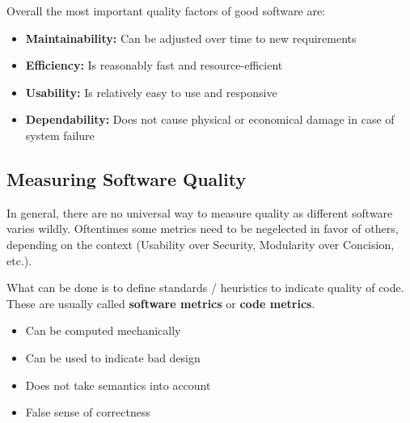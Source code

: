\documentclass[
../../Software_Engineering_Summary.tex,
]
{subfiles}
\begin{document}
Overall the most important quality factors of good software are:
\begin{itemize}
    \item \textbf{Maintainability:} Can be adjusted over time to new requirements
    \item \textbf{Efficiency:} Is reasonably fast and resource-efficient
    \item \textbf{Usability:} Is relatively easy to use and responsive
    \item \textbf{Dependability:} Does not cause physical or economical damage in case of system failure
\end{itemize}

\subsection{Measuring Software Quality}
In general, there are no universal way to measure quality as different software varies wildly. Oftentimes some metrics need to be negelected in favor of others, depending on the context (Usability over Security, Modularity over Concision, etc.).

What can be done is to define standards / heuristics to indicate quality of code. These are usually called \textbf{software metrics} or \textbf{code metrics}.

\begin{minipage}
    [t]{0.47\textwidth}
    \begin{defbox}
        \begin{itemize}
            \item Can be computed mechanically
            \item Can be used to indicate bad design
        \end{itemize}
    \end{defbox}
\end{minipage}
\hfill
\begin{minipage}
    [t]{0.47\textwidth}
    \begin{defbox}
        \begin{itemize}
            \item Does not take semantics into account
            \item False sense of correctness
        \end{itemize}
    \end{defbox}
\end{minipage}
\end{document}
